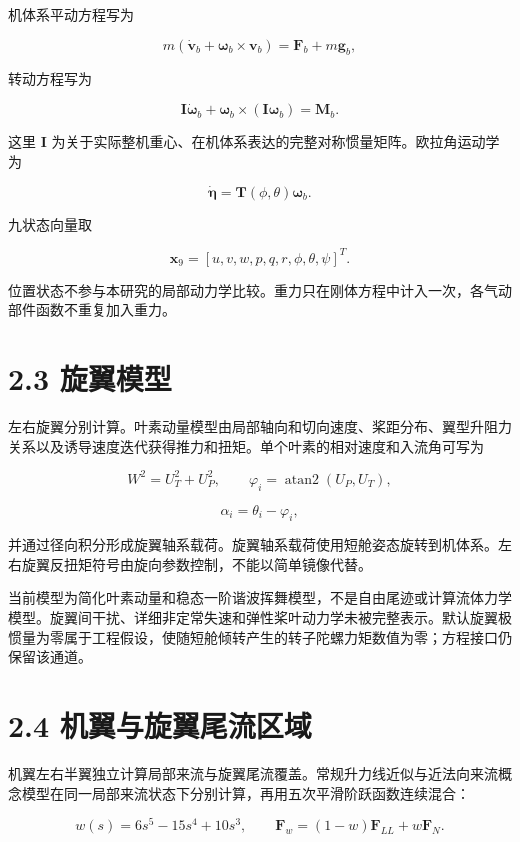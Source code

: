 机体系平动方程写为

\[m(\dot{\mathbf{v}}_b+\boldsymbol{\omega}_b\times\mathbf{v}_b)
=\mathbf{F}_b+m\mathbf{g}_b,\]

转动方程写为

\[\mathbf{I}\dot{\boldsymbol{\omega}}_b
+\boldsymbol{\omega}_b\times(\mathbf{I}\boldsymbol{\omega}_b)
=\mathbf{M}_b.\]

这里 \(\mathbf{I}\)
为关于实际整机重心、在机体系表达的完整对称惯量矩阵。欧拉角运动学为

\[\dot{\boldsymbol{\eta}}=\mathbf{T}(\phi,\theta)\boldsymbol{\omega}_b.\]

九状态向量取

\[\mathbf{x}_9=[u,v,w,p,q,r,\phi,\theta,\psi]^T.\]

位置状态不参与本研究的局部动力学比较。重力只在刚体方程中计入一次，各气动部件函数不重复加入重力。

\section{2.3 旋翼模型}\label{23-ux65cbux7ffcux6a21ux578b}

左右旋翼分别计算。叶素动量模型由局部轴向和切向速度、桨距分布、翼型升阻力关系以及诱导速度迭代获得推力和扭矩。单个叶素的相对速度和入流角可写为

\[W^2=U_T^2+U_P^2,\qquad \varphi_i=\operatorname{atan2}(U_P,U_T),\]

\[\alpha_i=\theta_i-\varphi_i,\]

并通过径向积分形成旋翼轴系载荷。旋翼轴系载荷使用短舱姿态旋转到机体系。左右旋翼反扭矩符号由旋向参数控制，不能以简单镜像代替。

当前模型为简化叶素动量和稳态一阶谐波挥舞模型，不是自由尾迹或计算流体力学模型。旋翼间干扰、详细非定常失速和弹性桨叶动力学未被完整表示。默认旋翼极惯量为零属于工程假设，使随短舱倾转产生的转子陀螺力矩数值为零；方程接口仍保留该通道。

\section{2.4
机翼与旋翼尾流区域}\label{24-ux673aux7ffcux4e0eux65cbux7ffcux5c3eux6d41ux533aux57df}

机翼左右半翼独立计算局部来流与旋翼尾流覆盖。常规升力线近似与近法向来流概念模型在同一局部来流状态下分别计算，再用五次平滑阶跃函数连续混合：

\[w(s)=6s^5-15s^4+10s^3,\qquad
\mathbf{F}_w=(1-w)\mathbf{F}_{LL}+w\mathbf{F}_{N}.\]

